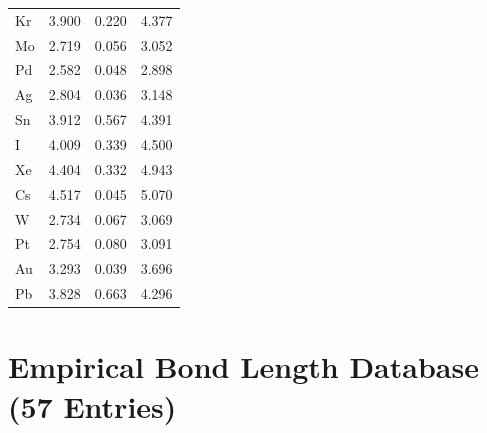 \documentclass[11pt,twoside]{article}
\begin{document}
\begin{longtable}{lrrr}
Kr & 3.900 & 0.220 & 4.377 \\
Mo & 2.719 & 0.056 & 3.052 \\
Pd & 2.582 & 0.048 & 2.898 \\
Ag & 2.804 & 0.036 & 3.148 \\
Sn & 3.912 & 0.567 & 4.391 \\
I  & 4.009 & 0.339 & 4.500 \\
Xe & 4.404 & 0.332 & 4.943 \\
Cs & 4.517 & 0.045 & 5.070 \\
W  & 2.734 & 0.067 & 3.069 \\
Pt & 2.754 & 0.080 & 3.091 \\
Au & 3.293 & 0.039 & 3.696 \\
Pb & 3.828 & 0.663 & 4.296 \\
\bottomrule
\end{longtable}


\section{Empirical Bond Length Database (57 Entries)}
\label{app:bonds}
\end{document}
